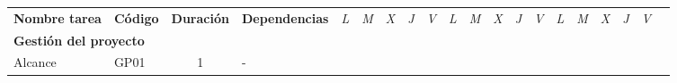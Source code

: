 \begin{longtable}[c]{llclllllllllllllllll}
        \multicolumn{1}{|c|}{\multirow{-2}{*}{\cellcolor[HTML]{FFFFFF}\textbf{Nombre tarea}}}                                   & \multicolumn{1}{c|}{\multirow{-2}{*}{\cellcolor[HTML]{FFFFFF}\textbf{Código}}} & \multicolumn{1}{c|}{\multirow{-2}{*}{\cellcolor[HTML]{FFFFFF}\textbf{Duración}}} & \multicolumn{1}{c|}{\multirow{-2}{*}{\cellcolor[HTML]{FFFFFF}\textbf{Dependencias}}} & \multicolumn{1}{l|}{\textit{L}} & \multicolumn{1}{l|}{\textit{M}} & \multicolumn{1}{l|}{\textit{X}} & \multicolumn{1}{l|}{\textit{J}} & \multicolumn{1}{l|}{\textit{V}} & \multicolumn{1}{l|}{\textit{L}} & \multicolumn{1}{l|}{\textit{M}} & \multicolumn{1}{l|}{\textit{X}} & \multicolumn{1}{l|}{\textit{J}} & \multicolumn{1}{l|}{\textit{V}} & \multicolumn{1}{l|}{\textit{L}} & \multicolumn{1}{l|}{\textit{M}} & \multicolumn{1}{l|}{\textit{X}} & \multicolumn{1}{l|}{\textit{J}} & \multicolumn{1}{l|}{\textit{V}}               &  \\ \cline{1-19}
        \multicolumn{4}{|l|}{\textbf{Gestión del proyecto}}                                                                                                                                                                                                                                                                                                                                & \multicolumn{15}{l|}{}                                                                                                                                                                                                                                                                                                                                                                                                                                                                                                                    &  \\ \cline{1-19}
        \multicolumn{1}{|l|}{Alcance}                                                                                           & \multicolumn{1}{l|}{GP01}                                                      & \multicolumn{1}{c|}{1}                                                           & \multicolumn{1}{l|}{-}                                                               & \cellcolor[HTML]{C6E0B4}        & \cellcolor[HTML]{C6E0B4}        & \cellcolor[HTML]{C6E0B4}        & \cellcolor[HTML]{C6E0B4}        & \cellcolor[HTML]{C6E0B4}        &                                 &                                 &                                 &                                 &                                 &                                 &                                 &                                 &                                 & \multicolumn{1}{l|}{}                         &  \\ \cline{1-4}

\end{longtable}
